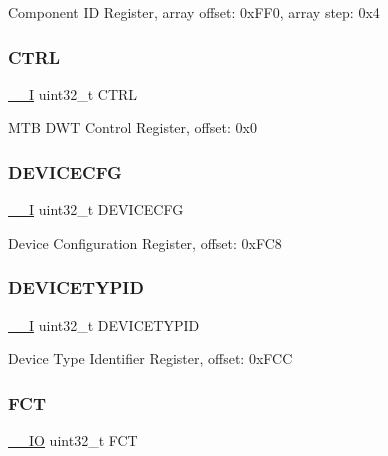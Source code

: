 Component ID Register, array offset\+: 0x\+F\+F0, array step\+: 0x4 \mbox{\label{struct_m_t_b_d_w_t___type_a9549c4cef02a58746721348d670e4672}} 
\subsubsection{\texorpdfstring{CTRL}{CTRL}}
{\footnotesize\ttfamily \mbox{\hyperlink{core__cm0plus_8h_af63697ed9952cc71e1225efe205f6cd3}{\+\_\+\+\_\+I}} uint32\+\_\+t C\+T\+RL}

M\+TB D\+WT Control Register, offset\+: 0x0 \mbox{\label{struct_m_t_b_d_w_t___type_af02c1de4dc7a10addebde14fb6e4fa40}} 
\subsubsection{\texorpdfstring{DEVICECFG}{DEVICECFG}}
{\footnotesize\ttfamily \mbox{\hyperlink{core__cm0plus_8h_af63697ed9952cc71e1225efe205f6cd3}{\+\_\+\+\_\+I}} uint32\+\_\+t D\+E\+V\+I\+C\+E\+C\+FG}

Device Configuration Register, offset\+: 0x\+F\+C8 \mbox{\label{struct_m_t_b_d_w_t___type_afbfc4df5e76d5106a7e22475e477a468}} 
\subsubsection{\texorpdfstring{DEVICETYPID}{DEVICETYPID}}
{\footnotesize\ttfamily \mbox{\hyperlink{core__cm0plus_8h_af63697ed9952cc71e1225efe205f6cd3}{\+\_\+\+\_\+I}} uint32\+\_\+t D\+E\+V\+I\+C\+E\+T\+Y\+P\+ID}

Device Type Identifier Register, offset\+: 0x\+F\+CC \mbox{\label{struct_m_t_b_d_w_t___type_afd5a884a462a6723edaced63ba23ba4e}} 
\subsubsection{\texorpdfstring{FCT}{FCT}}
{\footnotesize\ttfamily \mbox{\hyperlink{core__cm0plus_8h_aec43007d9998a0a0e01faede4133d6be}{\+\_\+\+\_\+\+IO}} uint32\+\_\+t F\+CT}

